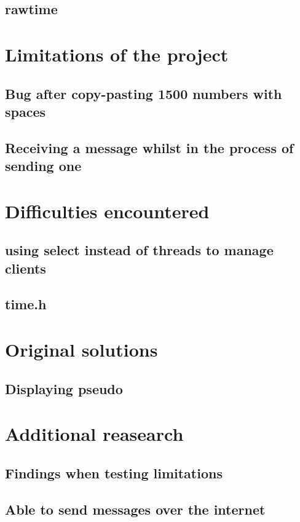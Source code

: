 \documentclass[utf8]{article}
\begin{document}
\subsection{rawtime}

\section{Limitations of the project}

\subsection{Bug after copy-pasting 1500 numbers with spaces}

\subsection{Receiving a message whilst in the process of sending one}

\section{Difficulties encountered}

\subsection{using select instead of threads to manage clients}

\subsection{time.h}

\section{Original solutions}

\subsection{Displaying pseudo}

\section{Additional reasearch}

\subsection{Findings when testing limitations}
\subsection{Able to send messages over the internet}
\end{document}
